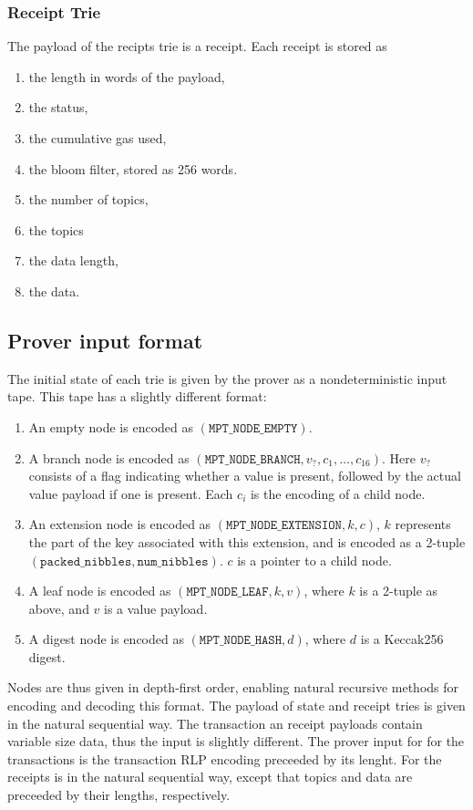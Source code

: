 \subsubsection{Receipt Trie}
The payload of the recipts trie is a receipt. Each receipt is stored as
\begin{enumerate}
	\item the length in words of the payload,
	\item the status,
	\item the cumulative gas used,
	\item the bloom filter, stored as 256 words.
	\item the number of topics,
	\item the topics
	\item the data length,
	\item the data.
\end{enumerate}


\subsection{Prover input format}

The initial state of each trie is given by the prover as a nondeterministic input tape. This tape has a slightly different format:
\begin{enumerate}
  \item An empty node is encoded as $(\texttt{MPT\_NODE\_EMPTY})$.
  \item A branch node is encoded as $(\texttt{MPT\_NODE\_BRANCH}, v_?, c_1, \dots, c_{16})$. Here $v_?$ consists of a flag indicating whether a value is present, followed by the actual value payload if one is present. Each $c_i$ is the encoding of a child node.
  \item An extension node is encoded as $(\texttt{MPT\_NODE\_EXTENSION}, k, c)$, $k$ represents the part of the key associated with this extension, and is encoded as a 2-tuple $(\texttt{packed\_nibbles}, \texttt{num\_nibbles})$. $c$ is a pointer to a child node.
  \item A leaf node is encoded as $(\texttt{MPT\_NODE\_LEAF}, k, v)$, where $k$ is a 2-tuple as above, and $v$ is a value payload.
  \item A digest node is encoded as $(\texttt{MPT\_NODE\_HASH}, d)$, where $d$ is a Keccak256 digest.
\end{enumerate}
Nodes are thus given in depth-first order, enabling natural recursive methods for encoding and decoding this format.
The payload of state and receipt tries is given in the natural sequential way. The transaction an receipt payloads contain variable size data, thus the input is slightly different. The prover input for for the transactions is the transaction RLP encoding preceeded by its lenght. For the receipts is in the natural sequential way, except that topics and data are preceeded by their lengths, respectively.

